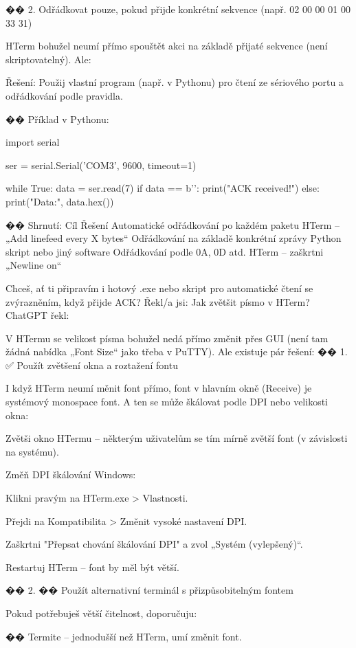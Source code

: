�� 2. Odřádkovat pouze, pokud přijde konkrétní sekvence (např. 02 00 00 01 00 33 31)

HTerm bohužel neumí přímo spouštět akci na základě přijaté sekvence (není skriptovatelný). Ale:

    Řešení: Použij vlastní program (např. v Pythonu) pro čtení ze sériového portu a odřádkování podle pravidla.

�� Příklad v Pythonu:

import serial

ser = serial.Serial('COM3', 9600, timeout=1)

while True:
    data = ser.read(7)
    if data == b'':
        print("ACK received!\n")
    else:
        print("Data:", data.hex())

�� Shrnutí:
Cíl	Řešení
Automatické odřádkování po každém paketu	HTerm – „Add linefeed every X bytes“
Odřádkování na základě konkrétní zprávy	Python skript nebo jiný software
Odřádkování podle 0A, 0D atd.	HTerm – zaškrtni „Newline on“

Chceš, ať ti připravím i hotový .exe nebo skript pro automatické čtení se zvýrazněním, když přijde ACK?
Řekl/a jsi:
Jak zvětšit písmo v HTerm?
ChatGPT řekl:

V HTermu se velikost písma bohužel nedá přímo změnit přes GUI (není tam žádná nabídka „Font Size“ jako třeba v PuTTY). Ale existuje pár řešení:
�� 1. ✅ Použít zvětšení okna a roztažení fontu

I když HTerm neumí měnit font přímo, font v hlavním okně (Receive) je systémový monospace font. A ten se může škálovat podle DPI nebo velikosti okna:

    Zvětši okno HTermu – některým uživatelům se tím mírně zvětší font (v závislosti na systému).

    Změň DPI škálování Windows:

        Klikni pravým na HTerm.exe > Vlastnosti.

        Přejdi na Kompatibilita > Změnit vysoké nastavení DPI.

        Zaškrtni "Přepsat chování škálování DPI" a zvol „Systém (vylepšený)“.

        Restartuj HTerm – font by měl být větší.

�� 2. �� Použít alternativní terminál s přizpůsobitelným fontem

Pokud potřebuješ větší čitelnost, doporučuju:

    �� Termite – jednodušší než HTerm, umí změnit font.

